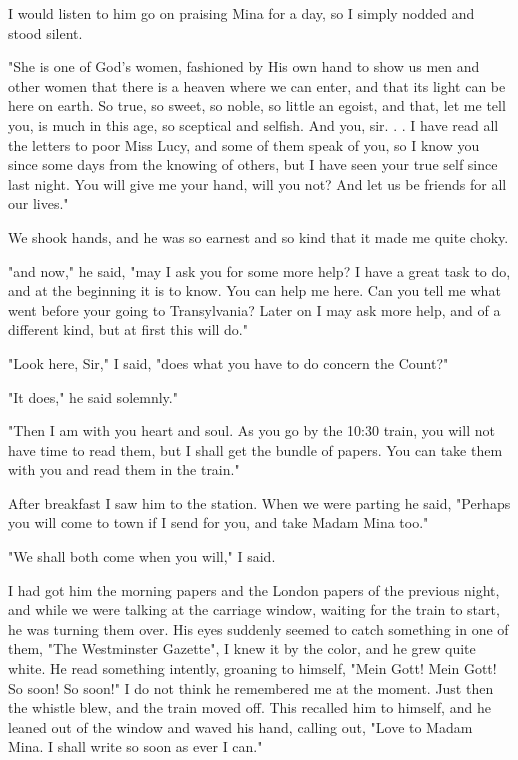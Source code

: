 I would listen to him go on praising Mina for a day, so I simply nodded and stood silent. 

"She is one of God's women, fashioned by His own hand to show us men and other women that there is a heaven where we can enter, and that its light can be here on earth. So true, so sweet, so noble, so little an egoist, and that, let me tell you, is much in this age, so sceptical and selfish. And you, sir. . . I have read all the letters to poor Miss Lucy, and some of them speak of you, so I know you since some days from the knowing of others, but I have seen your true self since last night. You will give me your hand, will you not? And let us be friends for all our lives." 

We shook hands, and he was so earnest and so kind that it made me quite choky. 

"and now," he said, "may I ask you for some more help? I have a great task to do, and at the beginning it is to know. You can help me here. Can you tell me what went before your going to Transylvania? Later on I may ask more help, and of a different kind, but at first this will do." 

"Look here, Sir," I said, "does what you have to do concern the Count?" 

"It does," he said solemnly." 

"Then I am with you heart and soul. As you go by the 10:30 train, you will not have time to read them, but I shall get the bundle of papers. You can take them with you and read them in the train." 

After breakfast I saw him to the station. When we were parting he said, "Perhaps you will come to town if I send for you, and take Madam Mina too." 

"We shall both come when you will," I said. 

I had got him the morning papers and the London papers of the previous night, and while we were talking at the carriage window, waiting for the train to start, he was turning them over. His eyes suddenly seemed to catch something in one of them, "The Westminster Gazette", I knew it by the color, and he grew quite white. He read something intently, groaning to himself, "Mein Gott! Mein Gott! So soon! So soon!" I do not think he remembered me at the moment. Just then the whistle blew, and the train moved off. This recalled him to himself, and he leaned out of the window and waved his hand, calling out, "Love to Madam Mina. I shall write so soon as ever I can." 

